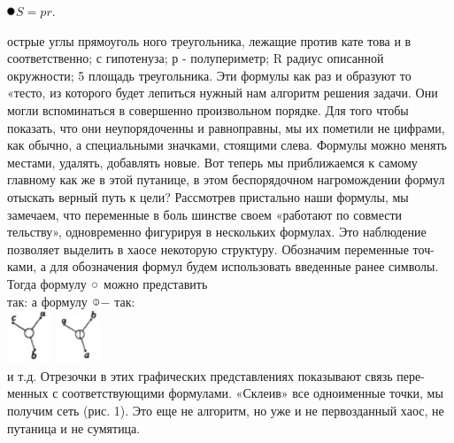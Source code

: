 \documentclass[a4paper]{article}
\begin{document}
\begin{multicols}{3}
\begin{center}
\includegraphics[width=0.02\textwidth]{круг7}$S = pr$.
\end{center}
острые углы прямоуголь ного треугольника, лежащие против кате това и в соответственно; с гипотенуза; р - полупериметр; R радиус описанной окружности; 5 площадь треугольника.
Эти формулы как раз и образуют то «тесто, из которого будет лепиться нужный нам алгоритм решения задачи. Они могли вспоминаться в совершенно
%
	произвольном порядке. Для того чтобы показать, что они неупорядоченны и
равноправны, мы их пометили не цифрами, как обычно, а специальными значками, стоящими слева. Формулы можно менять местами, удалять, добавлять новые.
Вот теперь мы приближаемся к самому главному как же в этой путанице, в этом беспорядочном нагромождении формул отыскать верный путь к цели?
Рассмотрев пристально наши формулы, мы замечаем, что переменные в боль шинстве своем «работают по совмести тельству», одновременно фигурируя в нескольких формулах. Это наблюдение позволяет выделить в хаосе некоторую структуру. Обозначим переменные точ- ками, а для обозначения формул будем использовать введенные ранее символы. \\Тогда формулу  \includegraphics[width=0.02\textwidth]{круг} можно представить
\\так: \hspace{40pt} а формулу \includegraphics[width=0.02\textwidth]{круг1}$-$ так: \\ \hspace{2pt} \includegraphics[width=0.1\textwidth]{кругичто}
 \hspace{20pt} \includegraphics[width=0.1\textwidth]{кругичто1}
\\и т.д. Отрезочки в этих графических представлениях показывают связь пере-
менных с соответствующими формулами. «Склеив» все одноименные точки, мы получим сеть (рис. 1).
Это еще не алгоритм, но уже и не первозданный хаос, не путаница и не сумятица.


\end{multicols}
\end{document}
